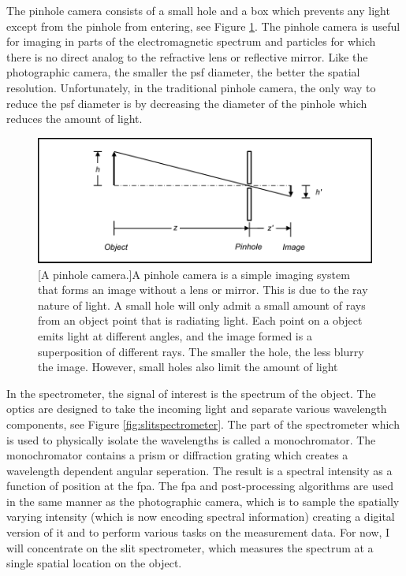The pinhole camera consists of a small hole and a box which prevents any light except from the pinhole from entering, see Figure \ref{fig:pinholecamera}. The pinhole camera is useful for imaging in parts of the electromagnetic spectrum and particles for which there is no direct analog to the refractive lens or reflective mirror. Like the photographic camera, the smaller the \gls{psf} diameter, the better the spatial resolution. Unfortunately, in the traditional pinhole camera, the only way to reduce the \gls{psf} diameter is by decreasing the diameter of the pinhole which reduces the amount of light.

\begin{figure}
    \includegraphics[scale=1]{pinholecamera}
    [A pinhole camera.]{A pinhole camera is a simple imaging system that forms an image without a lens or mirror. This is due to the ray nature of light. A small hole will only admit a small amount of rays from an object point that is radiating light. Each point on a object emits light at different angles, and the image formed is a superposition of different rays. The smaller the hole, the less blurry the image. However, small holes also limit the amount of light}
    \label{fig:pinholecamera}
\end{figure}

In the spectrometer, the signal of interest is the spectrum of the object. The optics are designed to take the incoming light and separate various wavelength components, see Figure \ref{fig:slitspectrometer}. The part of the spectrometer which is used to physically isolate the wavelengths is called a \gls{monochromator}. The monochromator contains a prism or diffraction grating which creates a wavelength dependent angular seperation. The result is a spectral intensity as a function of position at the \gls{fpa}. The \gls{fpa} and post-processing algorithms are used in the same manner as the photographic camera, which is to sample the spatially varying intensity (which is now encoding spectral information) creating a digital version of it and to perform various tasks on the measurement data. For now, I will concentrate on the slit spectrometer, which measures the spectrum at a single spatial location on the object.


